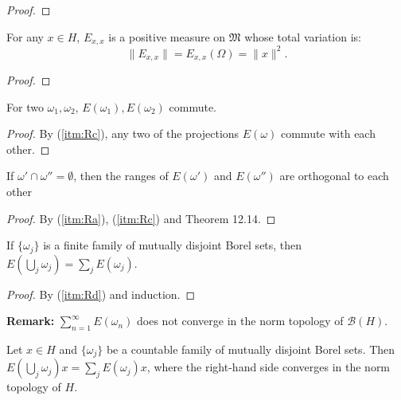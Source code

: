 \begin{proof}
\end{proof}

\begin{lemma}
  \label{lem:resId_measure}
  For any $x \in H$,
  \( E_{x,x} \) is a positive measure on \( \mathfrak{M} \) whose total variation is:
  \[
    \|E_{x,x}\| = E_{x,x}(\Omega) = \|x\|^2.
  \]
\end{lemma}

\begin{proof}

\end{proof}

\begin{lemma}
  \label{lem:resId_comm}
  For two $\omega_1, \omega_2$, \( E(\omega_1), E(\omega_2) \) commute.
\end{lemma}

\begin{proof}
  By (\ref{itm:Rc}), any two of the projections \( E(\omega) \) commute with each other.
\end{proof}

\begin{lemma}
  \label{lem:orthogonal_of_emptyset}
  If \( \omega' \cap \omega'' = \emptyset \),
  then the ranges of \( E(\omega') \) and \( E(\omega'') \) are orthogonal to each other
\end{lemma}

\begin{proof}
  By (\ref{itm:Ra}), (\ref{itm:Rc}) and Theorem 12.14.
\end{proof}

\begin{lemma}
  \label{lem:resId_iUnion}
  If $\{\omega_j\}$ is a finite family of mutually disjoint Borel sets, then
  $E(\bigcup_j \omega_j) = \sum_j E(\omega_j)$.
\end{lemma}

\begin{proof}
  By (\ref{itm:Rd}) and induction.
\end{proof}

\textbf{Remark:}
$\sum_{n=1}^{\infty} E(\omega_n)$ does not converge in the norm topology of $\mathcal{B}(H)$.

\begin{lemma}
  \label{lem:resId_iSum}
  Let $x \in H$ and $\{\omega_j\}$ be a countable family of mutually disjoint Borel sets.
  Then $E(\bigcup_j \omega_j)x = \sum_j E(\omega_j)x$, where
  the right-hand side converges in the norm topology of $H$.
\end{lemma}

